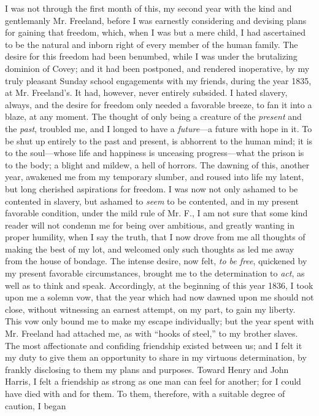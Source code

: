 I was not through the first month of this, my second year with the kind
and gentlemanly Mr. Freeland, before I was earnestly considering and
devising plans for gaining that freedom, which, when I was but a mere
child, I had ascertained to be the natural and inborn right of every
member of the human family. The desire for this freedom had been
benumbed, while I was under the brutalizing dominion of Covey; and it
had been postponed, and rendered inoperative, by my truly pleasant
Sunday school engagements with my friends, during the year 1835, at Mr.
Freeland's. It had, however, never entirely subsided. I hated slavery,
always, and the desire for freedom only needed a favorable breeze, to
fan it into a blaze, at any moment. The thought of only being a creature
of the \emph{present} and the \emph{past}, troubled me, and I longed to
have a \emph{future}---a future with hope in it. To be shut up entirely
to the past and present, is abhorrent to the human mind; it is to the
soul---whose life and happiness is unceasing progress---what the prison
is to the body; a blight and mildew, a hell of horrors. The dawning of
this, another year, awakened me from my temporary slumber, and roused
into life my latent, but long cherished aspirations for freedom. I was
now not only ashamed to be contented in slavery, but ashamed to
\emph{seem} to be contented, and in my present favorable condition,
under the mild rule of {}Mr. F., I am not sure that some kind reader
will not condemn me for being over ambitious, and greatly wanting in
proper humility, when I say the truth, that I now drove from me all
thoughts of making the best of my lot, and welcomed only such thoughts
as led me away from the house of bondage. The intense desire, now felt,
\emph{to be free}, quickened by my present favorable circumstances,
brought me to the determination to \emph{act}, as well as to think and
speak. Accordingly, at the beginning of this year 1836, I took upon me a
solemn vow, that the year which had now dawned upon me should not close,
without witnessing an earnest attempt, on my part, to gain my liberty.
This vow only bound me to make my escape individually; but the year
spent with Mr. Freeland had attached me, as with ``hooks of steel,'' to
my brother slaves. The most affectionate and confiding friendship
existed between us; and I felt it my duty to give them an opportunity to
share in my virtuous determination, by frankly disclosing to them my
plans and purposes. Toward Henry and John Harris, I felt a friendship as
strong as one man can feel for another; for I could have died with and
for them. To them, therefore, with a suitable degree of caution, I began
